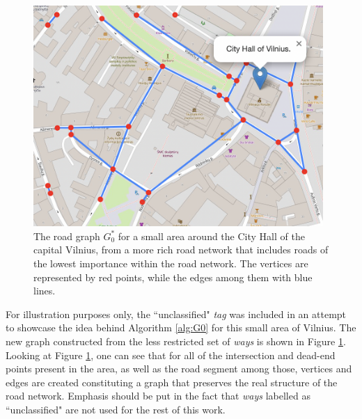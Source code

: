 \documentclass[12pt]{article}
\theoremstyle{definition}
\begin{document}
\begin{figure}
    \centering
    \includegraphics[width=11cm]{images/G0Unclassified.png}
    \caption{The road graph $G_0^*$ for a small area around the City Hall of the capital Vilnius, from a more rich road network that includes roads of the lowest importance within the road network. The vertices are represented by red points, while the edges among them with blue lines.}
    \label{fig:G0Unclassified}
\end{figure}

For illustration purposes only, the ``unclassified" \textit{tag} was included in an attempt to showcase the idea behind Algorithm \ref{alg:G0} for this small area of Vilnius. The new graph constructed from the less restricted set of \textit{ways} is shown in Figure \ref{fig:G0Unclassified}. Looking at Figure \ref{fig:G0Unclassified}, one can see that for all of the intersection and dead-end points present in the area, as well as the road segment among those, vertices and edges are created constituting a graph that preserves the real structure of the road network. Emphasis should be put in the fact that \textit{ways} labelled as ``unclassified" are not used for the rest of this work. 
\end{document}
